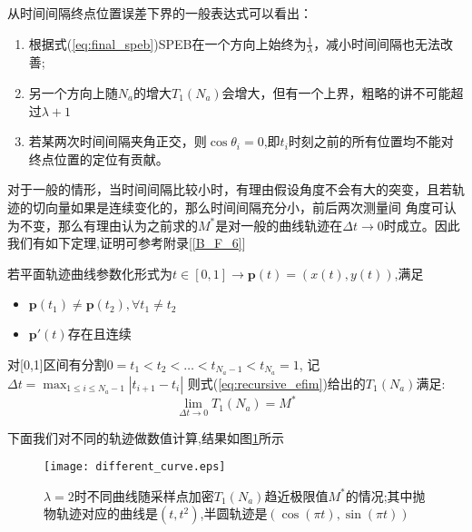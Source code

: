 从时间间隔终点位置误差下界的一般表达式可以看出：
\begin{enumerate}
  \item 根据式(\ref{eq:final_speb})SPEB在一个方向上始终为$\frac{1}{\lambda}$，减小时间间隔也无法改善;
  \item 另一个方向上随$N_a$的增大$T_1(N_a)$会增大，但有一个上界，粗略的讲不可能超过$\lambda+1$
  \item 若某两次时间间隔夹角正交，则$\cos\theta_i=0$,即$t_i$时刻之前的所有位置均不能对终点位置的定位有贡献。
\end{enumerate}
对于一般的情形，当时间间隔比较小时，有理由假设角度不会有大的突变，且若轨迹的切向量如果是连续变化的，那么时间间隔充分小，前后两次测量间
角度可认为不变，那么有理由认为之前求的$M^*$是对一般的曲线轨迹在$\Delta t\to 0$时成立。因此我们有如下定理,证明可参考附录[\ref{B_F_6}]
\begin{theorem}\label{theorem:arbitrary_curve}
若平面轨迹曲线参数化形式为$t\in[0,1]\rightarrow \bm{p}(t)=(x(t),y(t))$,满足
\begin{itemize}
\item $\bm{p}(t_1)\neq \bm{p}(t_2),\forall t_1\neq t_2$
\item $\bm{p}'(t)$存在且连续
\end{itemize}
对[0,1]区间有分割$0=t_1<t_2<\dots<t_{N_a-1}<t_{N_a}=1$,
记$\Delta t=\max_{1\leq i\leq N_a-1}|t_{i+1}-t_i|$
则式(\ref{eq:recursive_efim})给出的$T_1(N_a)$满足:
\begin{equation}\label{eq:limiting_cf}
\lim_{\Delta t\to 0}T_1(N_a)=M^*
\end{equation}
\end{theorem}

下面我们对不同的轨迹做数值计算,结果如图\ref{figure:tend_to_limit}所示
\begin{figure}
  \centering
  \texttt{[image: different\_curve.eps]}
  \caption{$\lambda=2$时不同曲线随采样点加密$T_1(N_a)$趋近极限值$M^*$的情况;其中抛物轨迹对应的曲线是$(t,t^2)$,半圆轨迹是$(\cos(\pi t),\sin(\pi t))$}\label{figure:tend_to_limit}
\end{figure}


